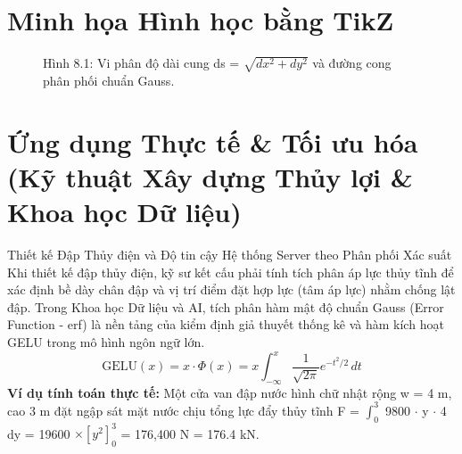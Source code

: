 \documentclass[11pt,a4paper,oneside]{book}
\begin{document}
\section{Minh họa Hình học bằng TikZ}
\begin{figure}[htbp]
\centering
{}
\caption{Hình 8.1: Vi phân độ dài cung ds = $\sqrt{dx^2 + dy^2}$ và đường cong phân phối chuẩn Gauss.}
\label{fig:tikz-ch8-arclength}
\end{figure}

\section{Ứng dụng Thực tế \& Tối ưu hóa (Kỹ thuật Xây dựng Thủy lợi \& Khoa học Dữ liệu)}
\begin{ungdung}{Thiết kế Đập Thủy điện và Độ tin cậy Hệ thống Server theo Phân phối Xác suất}
Khi thiết kế đập thủy điện, kỹ sư kết cấu phải tính tích phân áp lực thủy tĩnh để xác định bề dày chân đập và vị trí điểm đặt hợp lực (tâm áp lực) nhằm chống lật đập. Trong Khoa học Dữ liệu và AI, tích phân hàm mật độ chuẩn Gauss (Error Function - erf) là nền tảng của kiểm định giả thuyết thống kê và hàm kích hoạt GELU trong mô hình ngôn ngữ lớn.
\[ \text{GELU}(x) = x \cdot \Phi(x) = x \int_{-\infty}^x \frac{1}{\sqrt{2\pi}} e^{-t^2/2}\,dt \]
\noindent\textbf{Ví dụ tính toán thực tế:} Một cửa van đập nước hình chữ nhật rộng w = 4 m, cao 3 m đặt ngập sát mặt nước chịu tổng lực đẩy thủy tĩnh F = $\int_0^3$ 9800 $\cdot$  y $\cdot$  4 dy = 19600 $\times  [y^2]_0^3$ = 176,400 N = 176.4 kN.
\end{ungdung}
\end{document}
